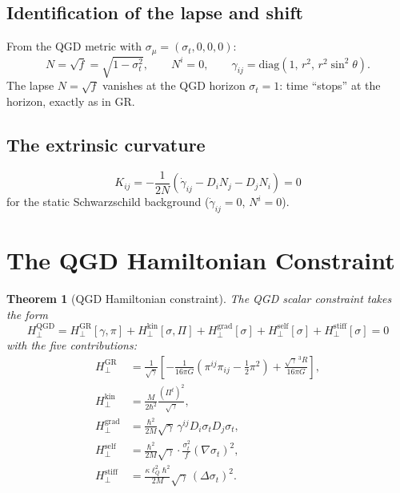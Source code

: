 \documentclass[11pt,a4paper]{article}
\theoremstyle{plain}
\newtheorem{theorem}{Theorem}[section]
\theoremstyle{definition}
\theoremstyle{remark}
\newcommand{\lQ}{\ell_Q}
\newcommand{\Hperp}{H_\perp}
\newcommand{\sigt}{\sigma_t}
\begin{document}
\subsection{Identification of the lapse and shift}

From the QGD metric with $\sigma_\mu = (\sigt,0,0,0)$:
\begin{equation}
  N = \sqrt{f} = \sqrt{1-\sigt^2}, \qquad N^i = 0, \qquad
  \gamma_{ij} = \mathrm{diag}(1,\,r^2,\,r^2\sin^2\theta).
  \label{eq:lapse_shift}
\end{equation}
The lapse $N = \sqrt{f}$ vanishes at the QGD horizon $\sigt = 1$: time ``stops''
at the horizon, exactly as in GR.

\subsection{The extrinsic curvature}

\begin{equation}
  K_{ij} = -\frac{1}{2N}\!\left(\dot\gamma_{ij} - D_iN_j - D_jN_i\right) = 0
  \label{eq:K}
\end{equation}
for the static Schwarzschild background ($\dot\gamma_{ij} = 0$, $N^i = 0$).

\section{The QGD Hamiltonian Constraint}
\label{sec:constraint}

\begin{theorem}[QGD Hamiltonian constraint]\label{thm:constraint}
The QGD scalar constraint takes the form
\begin{equation}
  \boxed{\Hperp^{\mathrm{QGD}} = \Hperp^{\mathrm{GR}}[\gamma,\pi]
    + H_\perp^{\mathrm{kin}}[\sigma,\Pi]
    + H_\perp^{\mathrm{grad}}[\sigma]
    + H_\perp^{\mathrm{self}}[\sigma]
    + H_\perp^{\mathrm{stiff}}[\sigma] = 0}
  \label{eq:constraint}
\end{equation}
with the five contributions:
\begin{align}
  \Hperp^{\mathrm{GR}}
  &= \frac{1}{\sqrt\gamma}\!\left[-\frac{1}{16\pi G}
      \left(\pi^{ij}\pi_{ij} - \tfrac{1}{2}\pi^2\right)
      + \frac{\sqrt\gamma\,{}^3\!R}{16\pi G}\right],
  \label{eq:H_GR}\\[4pt]
  H_\perp^{\mathrm{kin}}
  &= \frac{M}{2\hbar^2}\frac{(\Pi^t)^2}{\sqrt\gamma},
  \label{eq:H_kin}\\[4pt]
  H_\perp^{\mathrm{grad}}
  &= \frac{\hbar^2}{2M}\sqrt\gamma\,\gamma^{ij}D_i\sigt D_j\sigt,
  \label{eq:H_grad}\\[4pt]
  H_\perp^{\mathrm{self}}
  &= \frac{\hbar^2}{2M}\sqrt\gamma\cdot
    \frac{\sigt^2}{f}(\nabla\sigt)^2,
  \label{eq:H_self}\\[4pt]
  H_\perp^{\mathrm{stiff}}
  &= \frac{\kappa\lQ^2\hbar^2}{2M}\sqrt\gamma\,
    (\Delta\sigt)^2.
  \label{eq:H_stiff}
\end{align}
\end{theorem}
\end{document}
